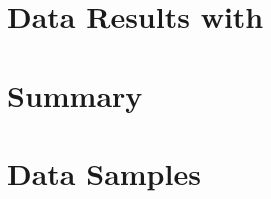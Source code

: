 \documentclass{cmspaper}
\begin{document}

\section{Data Results with \intlumi}

\section{Summary}



\newpage 
\appendix
\appendixpage
\section{Data Samples}
  \label{app:datasets}
  
  
\end{document}
